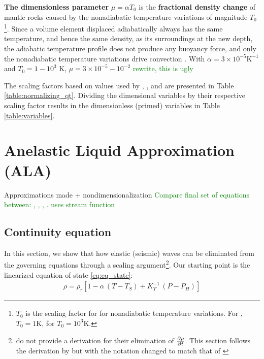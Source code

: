 \documentclass[a4paper]{article}
\begin{document}
\textbf{The dimensionless parameter} $\mu = \alpha T_0$ is the \textbf{fractional density change} of mantle rocks caused by the nonadiabatic temperature variations of magnitude $T_0$\footnote{$T_0$ is the scaling factor for 
for nonadiabatic temperature variations. For \textcite{jamc80}, $T_0 = 1 $K, for \textcite{scto01} $T_0 = 10^3$K.}. Since a volume element displaced adiabatically always has the same temperature, and hence the same density, as its surroundings at the new
depth, the adiabatic temperature profile does not produce any buoyancy force, and only the nonadiabatic temperature variations drive convection \autocite{scto01}.
With $\alpha = 3 \times 10^{-5} \text{K}^{-1}$ and $T_0 = 1-10^3$ K,  $\mu = 3 \times 10^{-5}-10^{-2}$ \textcolor{green}{rewrite, this is ugly}

The scaling factors based on values used by \textcite{jamc80}, \textcite{lezh08}, and \textcite{itki94} are presented in Table \ref{table:normalizing_qt}. 
Dividing the dimensional variables by their respective scaling factor results in the dimensionless (primed) variables in Table \ref{table:variables}. 

\section{Anelastic Liquid Approximation (ALA)} \label{section:ALA}
Approximations made + nondimensionalization 
\textcolor{green}{Compare final set of equations between:
\cite{jamc80}, \cite{itki94}, \cite{scto01}, \cite{gada20}.
\cite{jamc80} uses stream function}

\subsection{Continuity equation}
In this section, we show that how elastic (seismic) waves can be eliminated from the governing equations through a scaling argument\footnote{\textcite{jamc80} 
do not provide a derivation for their elimination of $\pdv{\rho}{t}$. This section follows the derivation
by \textcite{scto01} but with the notation changed to match that of \textcite{jamc80}}. 
Our starting point is the linearized equation of state \eqref{eq:eq_state}: 
\begin{align*}
    \rho= \rho_r \left[ 1 - \alpha\,(T-T_S) + K_T^{-1}\,(P-P_H) \right]
\end{align*}
\end{document}
